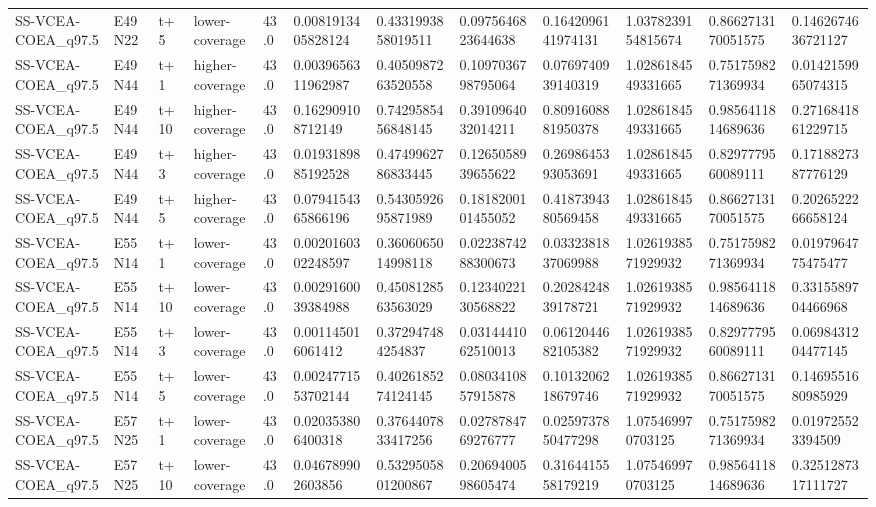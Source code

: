 \begin{landscape}
\begin{longtable}{llllllllllll}
SS-VCEA-COEA\_q97.5 & E49N22 & t+5 & lower-coverage & 43.0 & 0.0081913405828124 & 0.4331993858019511 & 0.0975646823644638 & 0.1642096141974131 & 1.0378239154815674 & 0.8662713170051575 & 0.1462674636721127 \\
SS-VCEA-COEA\_q97.5 & E49N44 & t+1 & higher-coverage & 43.0 & 0.0039656311962987 & 0.4050987263520558 & 0.1097036798795064 & 0.0769740939140319 & 1.0286184549331665 & 0.7517598271369934 & 0.0142159965074315 \\
SS-VCEA-COEA\_q97.5 & E49N44 & t+10 & higher-coverage & 43.0 & 0.162909108712149 & 0.7429585456848145 & 0.3910964032014211 & 0.8091608881950378 & 1.0286184549331665 & 0.9856411814689636 & 0.2716841861229715 \\
SS-VCEA-COEA\_q97.5 & E49N44 & t+3 & higher-coverage & 43.0 & 0.0193189885192528 & 0.4749962786833445 & 0.1265058939655622 & 0.2698645393053691 & 1.0286184549331665 & 0.8297779560089111 & 0.1718827387776129 \\
SS-VCEA-COEA\_q97.5 & E49N44 & t+5 & higher-coverage & 43.0 & 0.0794154365866196 & 0.5430592695871989 & 0.1818200101455052 & 0.4187394380569458 & 1.0286184549331665 & 0.8662713170051575 & 0.2026522266658124 \\
SS-VCEA-COEA\_q97.5 & E55N14 & t+1 & lower-coverage & 43.0 & 0.0020160302248597 & 0.3606065014998118 & 0.0223874288300673 & 0.0332381837069988 & 1.0261938571929932 & 0.7517598271369934 & 0.0197964775475477 \\
SS-VCEA-COEA\_q97.5 & E55N14 & t+10 & lower-coverage & 43.0 & 0.0029160039384988 & 0.4508128563563029 & 0.1234022130568822 & 0.2028424839178721 & 1.0261938571929932 & 0.9856411814689636 & 0.3315589704466968 \\
SS-VCEA-COEA\_q97.5 & E55N14 & t+3 & lower-coverage & 43.0 & 0.001145016061412 & 0.372947484254837 & 0.0314441062510013 & 0.0612044682105382 & 1.0261938571929932 & 0.8297779560089111 & 0.0698431204477145 \\
SS-VCEA-COEA\_q97.5 & E55N14 & t+5 & lower-coverage & 43.0 & 0.0024771553702144 & 0.4026185274124145 & 0.0803410857915878 & 0.1013206218679746 & 1.0261938571929932 & 0.8662713170051575 & 0.1469551680985929 \\
SS-VCEA-COEA\_q97.5 & E57N25 & t+1 & lower-coverage & 43.0 & 0.020353806400318 & 0.3764407833417256 & 0.0278784769276777 & 0.0259737850477298 & 1.075469970703125 & 0.7517598271369934 & 0.019725523394509 \\
SS-VCEA-COEA\_q97.5 & E57N25 & t+10 & lower-coverage & 43.0 & 0.046789902603856 & 0.5329505801200867 & 0.2069400598605474 & 0.3164415558179219 & 1.075469970703125 & 0.9856411814689636 & 0.3251287317111727 \\

\end{longtable}
\end{landscape}
